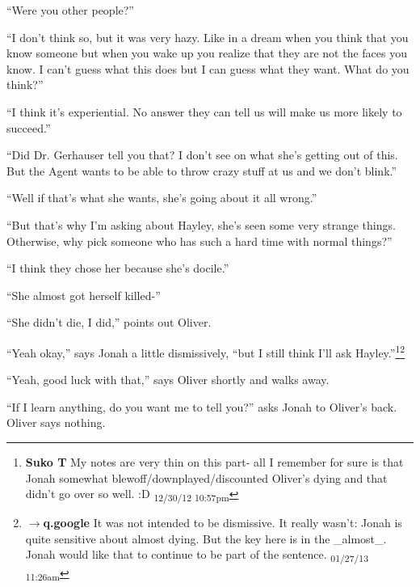 ``Were you other people?''

``I don't think so, but it was very hazy.  Like in a dream when you think that you know someone but when you wake up you realize that they are not the faces you know.  I can't guess what this does but I can guess what they want.  What do you think?''

``I think it's experiential.  No answer they can tell us will make us more likely to succeed.''

``Did Dr. Gerhauser tell you that?  I don't see on what she's getting out of this.  But the Agent wants to be able to throw crazy stuff at us and we don't blink.''

``Well if that's what she wants, she's going about it all wrong.''

``But that's why I'm asking about Hayley, she's seen some very strange things.  Otherwise, why pick someone who has such a hard time with normal things?''

``I think they chose her because she's docile.''

``She almost got herself killed-''

``She didn't die, I did,'' points out Oliver.

``Yeah okay,'' says Jonah a little dismissively, ``but I still think I'll ask Hayley.''\footnote{\textbf{Suko T }My notes are very thin on this part- all I remember for sure is that Jonah somewhat blewoff/downplayed/discounted Oliver's dying and that didn't go over so well. :D \textsubscript{12/30/12 10:57pm}}\footnote{$\rightarrow$\textbf{q.google }It was not intended to be dismissive.  It really wasn't: Jonah is quite sensitive about almost dying.  But the key here is in the \_almost\_.  Jonah would like that to continue to be part of the sentence. \textsubscript{01/27/13 11:26am}}

``Yeah, good luck with that,'' says Oliver shortly and walks away.

``If I learn anything, do you want me to tell you?'' asks Jonah to Oliver's back.  Oliver says nothing.



